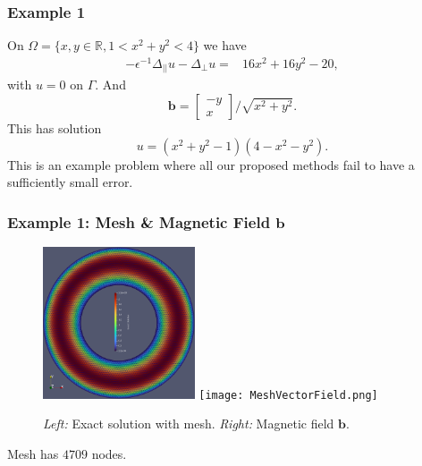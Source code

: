 \documentclass{beamer}
\begin{document}
    \begin{frame}
        \frametitle{Example 1}
        On $\Omega=\{x,y \in \mathbb{R}, 1 < x^2+y^2 < 4\}$ we have 
\begin{align*}
                -\epsilon^{-1}\Delta_{||}u-\Delta_{\bot}u=& 16x^2+16y^2 - 20,
 \end{align*}
 with $u = 0$ on $\Gamma$. And
 \begin{equation*}
 \mathbf{b} = \left[
 \begin{matrix}
 -y \\
 x 
 \end{matrix}
 \right]/\sqrt{x^2+y^2}.
 \end{equation*}
 This has solution
 \begin{equation*}
 u = (x^2+y^2-1)(4-x^2-y^2).
 \end{equation*}
    This is an example problem where all our proposed methods fail to have a sufficiently small error.
    \end{frame}
    \begin{frame}
        \frametitle{Example 1: Mesh \& Magnetic Field $\mathbf{b}$}
\begin{figure}
            \centering
            \includegraphics[width=0.4\textwidth]{Exact_Solution_Mesh.png} 
            \qquad
            \texttt{[image: MeshVectorField.png]} 
            \label{fig:example}
            \caption{{\it Left:} Exact solution with mesh. {\it Right:} Magnetic field $\mathbf{b}$.}
        \end{figure}
Mesh has $4709$ nodes.
\end{frame}
\end{document}
